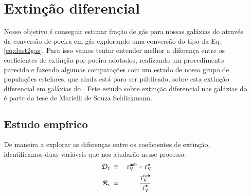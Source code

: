



\chapter{Extinção diferencial}
\label{sec:difextin}

Nosso objetivo é conseguir estimar fração de gás para nossas galáxias do \CAL através da conversão
de poeira em gás explorando uma conversão do tipo da Eq. \ref{eq:dust2gas}. Para isso vamos tentar
entender melhor a diferença entre os coeficientes de extinção por poeira adotados, realizando um
procedimento parecido e fazendo algumas comparações com um estudo de nosso grupo de populações
estelares, que ainda está para ser públicado, sobre esta extinção diferencial em galáxias do \SDSS.
Este estudo sobre extinção diferencial nas galáxias do \SDSS é parte da tese de Marielli de Souza
Schlickmann.

\section{Estudo empírico}
\label{sec:difextin:emp}

De maneira a explorar as diferenças entre os coeficientes de extinção, identificamos duas variáveis
que nos ajudarão nesse processo:
\begin{eqnarray}
	\mathcal{D}_\tau\ &\equiv&\ \tau_{\mathrm{V}}^{\mathrm{neb}} - \tau_{\mathrm{V}}^\star \\
	\label{eq:difftau}
	\mathcal{R}_\tau\ &\equiv&\ \frac{\tau_{\mathrm{V}}^{\mathrm{neb}}}{\tau_{\mathrm{V}}^\star} 
	\label{eq:ratiotau}
\end{eqnarray}

